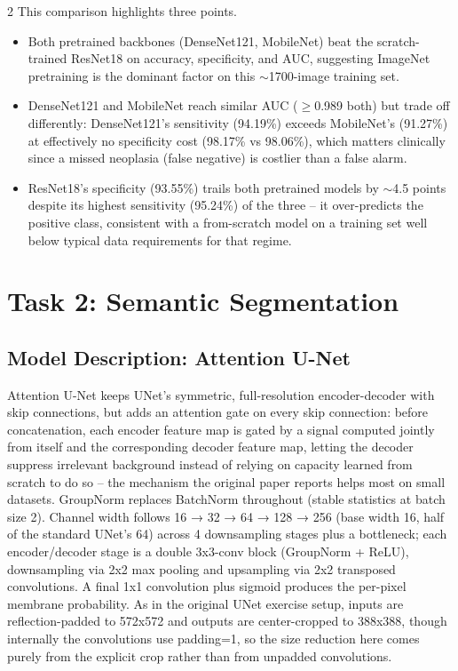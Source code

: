 ﻿\documentclass[a4paper,10pt]{article}
\begin{document}
\begin{multicols*}{2}
This comparison highlights three points. 
\begin{itemize}
	\item Both pretrained backbones (DenseNet121, MobileNet) beat the scratch-trained ResNet18 on accuracy, specificity, and AUC, suggesting ImageNet pretraining is the dominant factor on this $\sim$1700-image training set.
	\item DenseNet121 and MobileNet reach similar AUC ($\geq$0.989 both) but trade off differently: DenseNet121's sensitivity (94.19\%) exceeds MobileNet's (91.27\%) at effectively no specificity cost (98.17\% vs 98.06\%), which matters clinically since a missed neoplasia (false negative) is costlier than a false alarm.
	\item ResNet18's specificity (93.55\%) trails both pretrained models by $\sim$4.5 points despite its highest sensitivity (95.24\%) of the three -- it over-predicts the positive class, consistent with a from-scratch model on a training set well below typical data requirements for that regime.
\end{itemize}


\section{Task 2: Semantic Segmentation}

\subsection{Model Description: Attention U-Net}
Attention U-Net keeps UNet's symmetric, full-resolution encoder-decoder with skip connections, but adds an attention gate on every skip connection: before concatenation, each encoder feature map is gated by a signal computed jointly from itself and the corresponding decoder feature map, letting the decoder suppress irrelevant background instead of relying on capacity learned from scratch to do so -- the mechanism the original paper reports helps most on small datasets. GroupNorm replaces BatchNorm throughout (stable statistics at batch size 2). Channel width follows 16 → 32 → 64 → 128 → 256 (base width 16, half of the standard UNet's 64) across 4 downsampling stages plus a bottleneck; each encoder/decoder stage is a double 3x3-conv block (GroupNorm + ReLU), downsampling via 2x2 max pooling and upsampling via 2x2 transposed convolutions. A final 1x1 convolution plus sigmoid produces the per-pixel membrane probability. As in the original UNet exercise setup, inputs are reflection-padded to 572x572 and outputs are center-cropped to 388x388, though internally the convolutions use padding=1, so the size reduction here comes purely from the explicit crop rather than from unpadded convolutions.\\



\end{multicols*}
\end{document}
